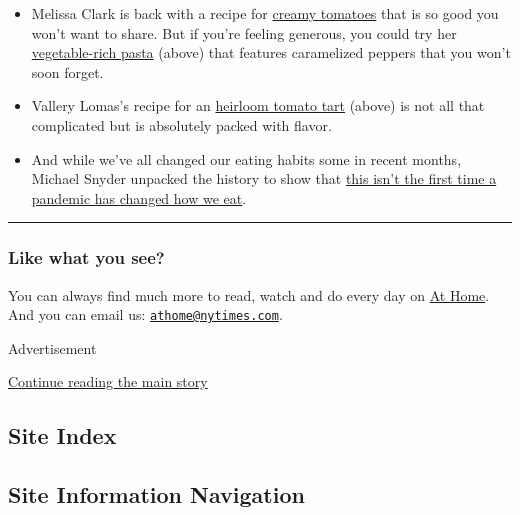 \begin{itemize}
\item
  Melissa Clark is back with a recipe for
  \href{https://www.nytimes.com/2020/07/15/dining/cheesy-tomatoes-recipe.html}{creamy
  tomatoes} that is so good you won't want to share. But if you're
  feeling generous, you could try her
  \href{https://www.nytimes.com/2020/07/17/dining/caramelized-pepper-pasta-recipe.html}{vegetable-rich
  pasta} (above) that features caramelized peppers that you won't soon
  forget.
\item
  Vallery Lomas's recipe for an
  \href{https://www.nytimes.com/2020/07/17/dining/heirloom-tomato-tart-recipe.html}{heirloom
  tomato tart} (above) is not all that complicated but is absolutely
  packed with flavor.
\item
  And while we've all changed our eating habits some in recent months,
  Michael Snyder unpacked the history to show that
  \href{https://www.nytimes.com/2020/07/16/t-magazine/eating-food-during-plague.html}{this
  isn't the first time a pandemic has changed how we eat}.
\end{itemize}

\begin{center}\rule{0.5\linewidth}{\linethickness}\end{center}

\hypertarget{like-what-you-see}{%
\subsubsection{Like what you see?}\label{like-what-you-see}}

You can always find much more to read, watch and do every day on
\href{https://www.nytimes.com/spotlight/at-home}{At Home}. And you can
email us:
\href{mailto:athome@nytimes.com}{\nolinkurl{athome@nytimes.com}}.

Advertisement

\protect\hyperlink{after-bottom}{Continue reading the main story}

\hypertarget{site-index}{%
\subsection{Site Index}\label{site-index}}

\hypertarget{site-information-navigation}{%
\subsection{Site Information
Navigation}\label{site-information-navigation}}

